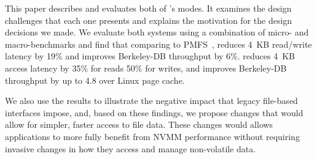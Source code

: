 {This paper describes and evaluates both of \Chell{}'s modes.  It examines the
design challenges that each one presents and explains the motivation for the
design decisions we made.  We evaluate both systems using a combination of
micro- and macro-benchmarks and find that comparing to PMFS~\cite{PMFS},
\DAChell{} reduces 4~KB read/write latency by 19\% and improves Berkeley-DB
throughput by 6\%. \CChell{} reduces 4~KB access latency by 35\% for reads
50\% for writes, and improves Berkeley-DB throughput by up to 4.8\x{} over Linux page cache.

We also use the results to illustrate the negative impact that legacy
file-based interfaces impose, and, based on these findings, we propose changes
that would allow for simpler, faster access to file data.  These changes would
allows applications to more fully benefit from NVMM performance without
requiring invasive changes in how they access and manage non-volatile data.
}



